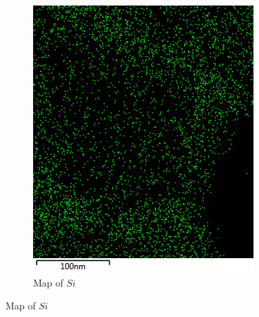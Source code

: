\documentclass[12pt,a4paper]{article}
\begin{document}
\begin{figure}
\begin{subfigure}[b]{0.35\textwidth}
    \includegraphics[width=\textwidth]{Data/Si Map.png}
    \caption{Map of $Si$}
    \label{fig:si_map}
  \end{subfigure}


\end{figure}
\end{document}
